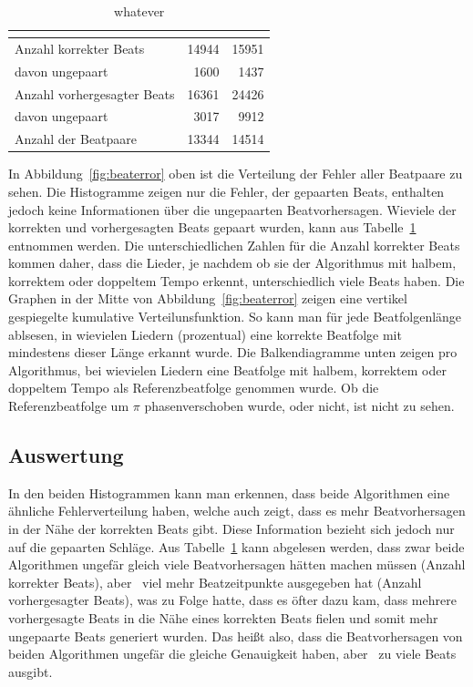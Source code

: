 {{		\begin{table}[h]
			\centering
			\begin{tabular}{l | r | r}
				                            & \cite{2009_DaPlSt} & \cite{2011_PlRoSt} \\
				\hline \hline
				Anzahl korrekter Beats      & \num{14944}        & \num{15951}        \\
				davon ungepaart             &  \num{1600}        &  \num{1437}        \\
				\hline
				Anzahl vorhergesagter Beats & \num{16361}        & \num{24426}        \\
				davon ungepaart             &  \num{3017}        &  \num{9912}        \\
				\hline
				Anzahl der Beatpaare        & \num{13344}        & \num{14514}
			\end{tabular}
			\caption{whatever}
			\label{tab:pairnum}
		\end{table}

		In Abbildung~\ref{fig:beaterror} oben ist die Verteilung der Fehler aller Beatpaare zu sehen.
		Die Histogramme zeigen nur die Fehler,
			der gepaarten Beats,
			enthalten jedoch keine Informationen über die ungepaarten Beatvorhersagen.
		Wieviele der korrekten und vorhergesagten Beats gepaart wurden,
			kann aus Tabelle~\ref{tab:pairnum} entnommen werden.
		Die unterschiedlichen Zahlen für die Anzahl korrekter Beats kommen daher,
			dass die Lieder,
			je nachdem ob sie der Algorithmus mit halbem, korrektem oder doppeltem Tempo erkennt,
			unterschiedlich viele Beats haben.
		Die Graphen in der Mitte von Abbildung~\ref{fig:beaterror} zeigen eine vertikel gespiegelte kumulative Verteilunsfunktion.
		So kann man für jede Beatfolgenlänge ablsesen,
			in wievielen Liedern (prozentual) eine korrekte Beatfolge mit mindestens dieser Länge erkannt wurde.
		Die Balkendiagramme unten zeigen pro Algorithmus,
			bei wievielen Liedern eine Beatfolge mit halbem, korrektem oder doppeltem Tempo als Referenzbeatfolge genommen wurde.
		Ob die Referenzbeatfolge um $\pi$ phasenverschoben wurde, oder nicht, ist nicht zu sehen.
	}

	\subsection{Auswertung}
	{
		In den beiden Histogrammen kann man erkennen,
			dass beide Algorithmen eine ähnliche Fehlerverteilung haben,
			welche auch zeigt,
			dass es mehr Beatvorhersagen in der Nähe der korrekten Beats gibt.
		Diese Information bezieht sich jedoch nur auf die gepaarten Schläge.
		Aus Tabelle~\ref{tab:pairnum} kann abgelesen werden,
			dass zwar beide Algorithmen ungefär gleich viele Beatvorhersagen hätten machen müssen (Anzahl korrekter Beats),
			aber~\cite{2011_PlRoSt} viel mehr Beatzeitpunkte ausgegeben hat (Anzahl vorhergesagter Beats),
			was zu Folge hatte,
			dass es öfter dazu kam,
			dass mehrere vorhergesagte Beats in die Nähe eines korrekten Beats fielen
			und somit mehr ungepaarte Beats generiert wurden.
		Das heißt also,
			dass die Beatvorhersagen von beiden Algorithmen ungefär die gleiche Genauigkeit haben,
			aber~\cite{2011_PlRoSt} zu viele Beats ausgibt.

}}
